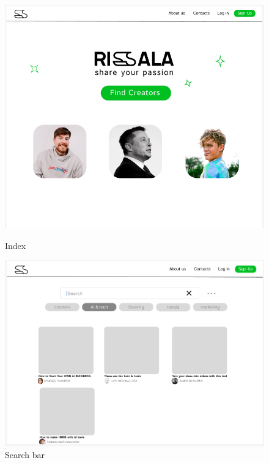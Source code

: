 \clearpage
\begin{figure}[htbp]
    \centering
    \begin{minipage}[b]{0.4\textwidth}
        \centering
        \includegraphics[width=\textwidth]{interfaces/index.png}
        \caption{Index}
        \label{fig:index}
    \end{minipage}
    \hfill
    \begin{minipage}[b]{0.4\textwidth}
        \centering
        \includegraphics[width=\textwidth]{interfaces/search.png}
        \caption{Search bar }
        \label{fig:connexion}
    \end{minipage}
\end{figure}
